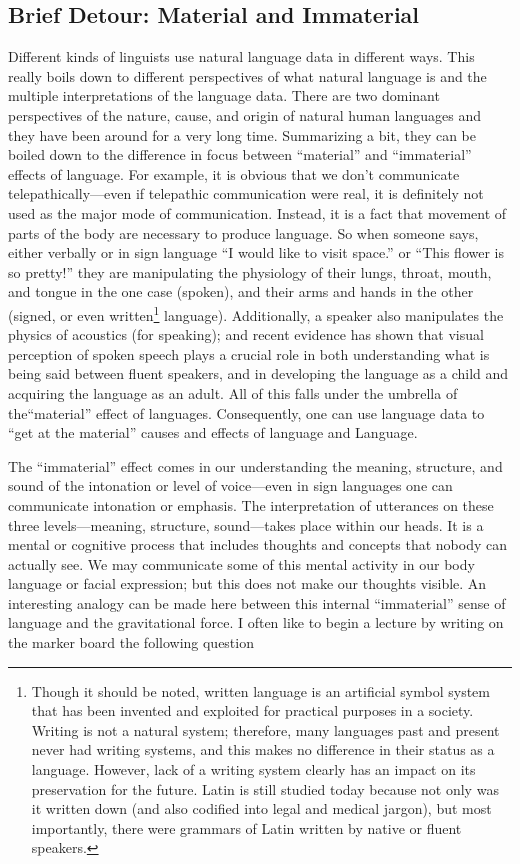 \documentclass[11pt]{book}%
\theoremstyle{plain}
\numberwithin{equation}{section}
\theoremstyle{definition}
\newtheorem{phrase string}{Phrase String}
\begin{document}
\subsection{Brief Detour: Material and Immaterial}
Different kinds of linguists use natural language data in different ways. This really boils down to different perspectives of what natural language is and the multiple interpretations of the language data. There are two dominant perspectives of the nature, cause, and origin of natural human languages and they have been around for a very long time. Summarizing a bit, they can be boiled down to the difference in focus between ``material'' and ``immaterial'' effects of language. For example, it is obvious that we don't communicate telepathically---even if telepathic communication were real, it is definitely not used as the major mode of communication. Instead, it is a fact that movement of parts of the body are necessary to produce language. So when someone says, either verbally or in sign language ``I would like to visit space.'' or ``This flower is so pretty!'' they are manipulating the physiology of their lungs, throat, mouth, and tongue in the one case (spoken), and their arms and hands in the other (signed, or even written\footnote{Though it should be noted, written language is an artificial symbol system that has been invented and exploited for practical purposes in a society. Writing is not a natural system; therefore, many languages past and present never had writing systems, and this makes no difference in their status as a language. However, lack of a writing system clearly has an impact on its preservation for the future. Latin is still studied today because not only was it written down (and also codified into legal and medical jargon), but most importantly, there were grammars of Latin written by native or fluent speakers.} language). Additionally, a speaker also manipulates the physics of acoustics (for speaking); and recent evidence has shown that visual perception of spoken speech plays a crucial role in both understanding what is being said between fluent speakers, and in developing the language as a child and acquiring the language as an adult. All of this falls under the umbrella of the``material'' effect of languages. Consequently, one can use language data to ``get at the material'' causes and effects of language and Language. 

The ``immaterial'' effect comes in our understanding the meaning, structure, and sound of the intonation or level of voice---even in sign languages one can communicate intonation or emphasis. The interpretation of utterances on these three levels---meaning, structure, sound---takes place within our heads. It is a mental or cognitive process that includes thoughts and concepts that nobody can actually see. We may communicate some of this mental activity in our body language or facial expression; but this does not make our thoughts visible. An interesting analogy can be made here between this internal ``immaterial'' sense of language and the gravitational force. I often like to begin a lecture by writing on the marker board the following question
\end{document}
